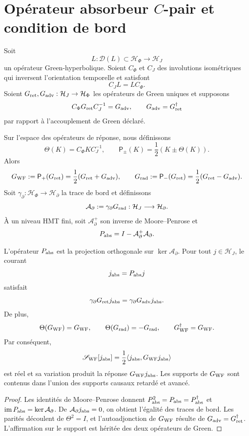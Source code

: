 \section{Opérateur absorbeur \(C\)-pair et condition de bord}
\label{sec:hmtf2-absorbedor}

Soit
\[
 L:\mathcal D(L)\subset\mathcal H_\Phi\longrightarrow\mathcal H_J
\]
un opérateur Green-hyperbolique. Soient \(C_\Phi\) et \(C_J\) des involutions
isométriques qui inversent l'orientation temporelle et satisfont
\[
 C_J L=L C_\Phi.
\]
Soient \(G_{\rm ret},G_{\rm adv}:\mathcal H_J\to\mathcal H_\Phi\) les opérateurs de Green
uniques et supposons
\[
 C_\Phi G_{\rm ret}C_J^{-1}=G_{\rm adv},
 \qquad
 G_{\rm adv}=G_{\rm ret}^{\dagger}
\]
par rapport à l'accouplement de Green déclaré.

Sur l'espace des opérateurs de réponse, nous définissons
\[
 \Theta(K)=C_\Phi K C_J^{-1},\qquad
 \mathsf P_\pm(K)=\frac12(K\pm\Theta(K)).
\]
Alors
\[
 G_{\rm WF}:=\mathsf P_+(G_{\rm ret})
 =\frac12(G_{\rm ret}+G_{\rm adv}),
 \qquad
 G_{\rm rad}:=\mathsf P_-(G_{\rm ret})
 =\frac12(G_{\rm ret}-G_{\rm adv}).
\]
Soit \(\gamma_\partial:\mathcal H_\Phi\to\mathcal H_\partial\) la trace de
bord et définissons
\[
 \mathcal A_\partial
 :=\gamma_\partial G_{\rm rad}:
 \mathcal H_J\longrightarrow\mathcal H_\partial.
\]
À un niveau HMT fini, soit \(\mathcal A_\partial^+\) son inverse de
Moore--Penrose et
\[
 P_{\rm abs}=I-\mathcal A_\partial^+\mathcal A_\partial.
\]

\begin{theorem}
\label{thm:hmtf2-absorbedor}
L'opérateur \(P_{\rm abs}\) est la projection orthogonale sur
\(\ker\mathcal A_\partial\). Pour tout \(j\in\mathcal H_J\), le courant
\[
 j_{\rm abs}=P_{\rm abs}j
\]
satisfait
\[
 \gamma_\partial G_{\rm ret}j_{\rm abs}
 =\gamma_\partial G_{\rm adv}j_{\rm abs}.
\]
De plus,
\[
 \Theta(G_{\rm WF})=G_{\rm WF},\qquad
 \Theta(G_{\rm rad})=-G_{\rm rad},\qquad
 G_{\rm WF}^{\dagger}=G_{\rm WF}.
\]
Par conséquent,
\[
 \mathscr S_{\rm WF}[j_{\rm abs}]
 =\frac12\langle j_{\rm abs},G_{\rm WF}j_{\rm abs}\rangle
\]
est réel et sa variation produit la réponse \(G_{\rm WF}j_{\rm abs}\).
Les supports de \(G_{\rm WF}\) sont contenus dans l'union des supports
causaux retardé et avancé.
\end{theorem}

\begin{proof}
Les identités de Moore--Penrose donnent
\(P_{\rm abs}^2=P_{\rm abs}=P_{\rm abs}^{\dagger}\) et
\(\operatorname{im}P_{\rm abs}=\ker\mathcal A_\partial\). De
\(\mathcal A_\partial j_{\rm abs}=0\), on obtient l'égalité des traces de
bord. Les parités découlent de \(\Theta^2=I\), et l'autoadjonction de
\(G_{\rm WF}\) résulte de
\(G_{\rm adv}=G_{\rm ret}^{\dagger}\). L'affirmation sur le support est héritée
des deux opérateurs de Green.
\end{proof}

